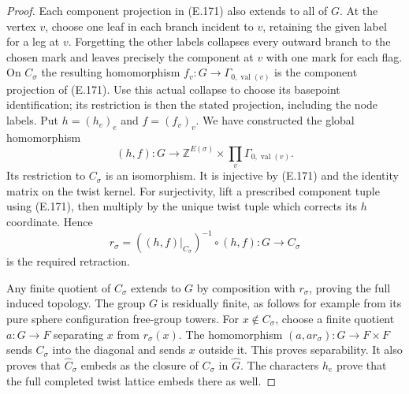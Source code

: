 \begin{proof}
Each component projection in (E.171) also extends to all of
$G$.  At the vertex $v$, choose one leaf in each branch incident
to $v$, retaining the given label for a leg at $v$.  Forgetting
the other labels collapses every outward branch to the chosen
mark and leaves precisely the component at $v$ with one mark
for each flag.  On $C_\sigma$ the resulting homomorphism
$f_v:G\to\Gamma_{0,\operatorname{val}(v)}$ is the component
projection of (E.171).  Use this actual collapse to choose its
basepoint identification; its restriction is then the stated
projection, including the node labels.  Put $h=(h_e)_e$ and
$f=(f_v)_v$.  We have constructed the global homomorphism
\[
 (h,f):G\longrightarrow
  \mathbb Z^{E(\sigma)}\times
                      \prod_v\Gamma_{0,\operatorname{val}(v)}.
                                                               \tag{E.172}
\]
Its restriction to $C_\sigma$ is an isomorphism.  It is
injective by (E.171) and the identity matrix on the twist
kernel.  For surjectivity, lift a prescribed component tuple
using (E.171), then multiply by the unique twist tuple which
corrects its $h$ coordinate.  Hence
\[
 r_\sigma=((h,f)|_{C_\sigma})^{-1}\circ(h,f):G\to C_\sigma
                                                               \tag{E.173}
\]
is the required retraction.

Any finite quotient of $C_\sigma$ extends to $G$ by composition
with $r_\sigma$, proving the full induced topology.  The group
$G$ is residually finite, as follows for example from its pure
sphere configuration free-group towers.  For $x\notin
C_\sigma$, choose a finite quotient $a:G\to F$ separating
$x$ from $r_\sigma(x)$.  The homomorphism
$(a,a r_\sigma):G\to F\times F$ sends $C_\sigma$ into the
diagonal and sends $x$ outside it.  This proves separability.
It also proves that $\widehat C_\sigma$ embeds as the closure
of $C_\sigma$ in $\widehat G$.  The characters $h_e$ prove
that the full completed twist lattice embeds there as well.


\end{proof}
